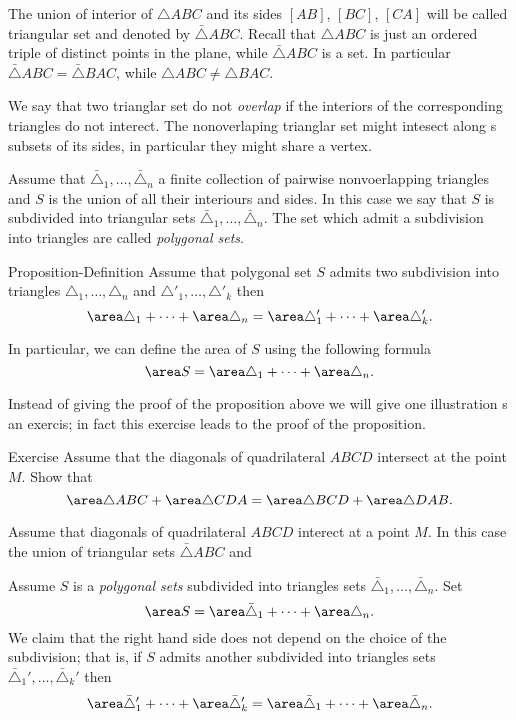 {The union of interior of $\triangle ABC$ and its sides $[AB]$, $[BC]$, $[CA]$
will be called triangular set and denoted by $\bar\triangle ABC$.
Recall that $\triangle ABC$ is just an ordered triple of distinct points in the plane,
while $\bar\triangle ABC$ is a set.
In particular $\bar\triangle ABC=\bar\triangle BAC$, while $\triangle ABC\ne\triangle BAC$.

We say that two trianglar set do not \emph{overlap} if the interiors of the corresponding triangles do not interect.
The nonoverlaping trianglar set might intesect along s subsets of its sides, in particular they might share a vertex.

Assume that  $\bar\triangle_1,\dots,\bar\triangle_n$ a finite collection of pairwise nonvoerlapping triangles
and $S$ is the union of all their interiours and sides.
In this case we say that $S$ is subdivided into triangular sets $\bar\triangle_1,\dots,\bar\triangle_n$.
The set which admit a subdivision into triangles are called \emph{polygonal sets}.

\begin{thm}{Proposition-Definition}
Assume that polygonal set $S$ admits two subdivision into triangles
$\triangle_1,\dots,\triangle_n$
and $\triangle'_1,\dots,\triangle'_k$
then
\[\area\triangle_1+\dots+\area\triangle_n
=\area\triangle'_1+\dots+\area\triangle'_k.\]

In particular, we can define the area of $S$ using the following formula
\[\area S=\area\triangle_1+\dots+\area\triangle_n.\]

\end{thm}

Instead of giving the proof of the proposition above we will give one illustration s an exercis;
in fact this exercise leads to the proof of the proposition.

\begin{thm}{Exercise}
Assume that the diagonals of quadrilateral $ABCD$ intersect at the point $M$.
Show that
\[\area\triangle ABC+\area\triangle CDA=\area\triangle BCD+\area\triangle DAB.\]
\end{thm}

Assume that diagonals of quadrilateral $ABCD$ interect at a point $M$.
In this case the union of triangular sets $\bar\triangle ABC$ and 

Assume $S$ is a \emph{polygonal sets} subdivided into triangles sets $\bar\triangle_1,\dots,\bar\triangle_n$.
Set 
\[\area S=\area\bar\triangle_1+\dots+\area\triangle_n.\]
We claim that the right hand side does not depend on the choice of the subdivision; 
that is, if $S$ admits another subdivided into triangles sets $\bar\triangle_1',\dots,\bar\triangle_k'$
then 
\[\area\bar\triangle'_1+\dots+\area\bar\triangle'_k
=
\area\bar\triangle_1+\dots+\area\bar\triangle_n.\]


}
